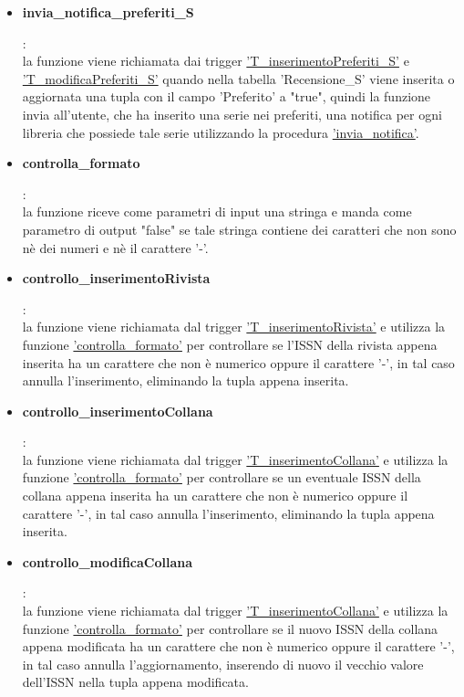 \documentclass{article}
\begin{document}
\begin{itemize}
    \item \hypertarget{f23}{\textbf{invia\_notifica\_preferiti\_S}}:\\
    la funzione viene richiamata dai trigger \hyperlink{t24}{'T\_inserimentoPreferiti\_S'} e \hyperlink{t25}{'T\_modificaPreferiti\_S'} quando nella tabella 'Recensione\_S' viene inserita o aggiornata una tupla con il campo 'Preferito' a "true", quindi la funzione invia all'utente, che ha inserito una serie nei preferiti, una notifica per ogni libreria che possiede tale serie utilizzando la procedura \hyperlink{p1}{'invia\_notifica'}.

    \item \hypertarget{f24}{\textbf{controlla\_formato}}:\\
    la funzione riceve come parametri di input una stringa e manda come parametro di output "false" se tale stringa contiene dei caratteri che non sono nè dei numeri e nè il carattere '-'.

    \item \hypertarget{f25}{\textbf{controllo\_inserimentoRivista}}:\\
    la funzione viene richiamata dal trigger \hyperlink{t26}{'T\_inserimentoRivista'} e utilizza la funzione \hyperlink{f24}{'controlla\_formato'} per controllare se l'ISSN della rivista appena inserita ha un carattere che non è numerico oppure il carattere '-', in tal caso annulla l'inserimento, eliminando la tupla appena inserita.

    \item \hypertarget{f26}{\textbf{controllo\_inserimentoCollana}}:\\
    la funzione viene richiamata dal trigger \hyperlink{t27}{'T\_inserimentoCollana'} e utilizza la funzione \hyperlink{f24}{'controlla\_formato'} per controllare se un eventuale ISSN della collana appena inserita ha un carattere che non è numerico oppure il carattere '-', in tal caso annulla l'inserimento, eliminando la tupla appena inserita.

    \item \hypertarget{f27}{\textbf{controllo\_modificaCollana}}:\\
    la funzione viene richiamata dal trigger \hyperlink{t28}{'T\_inserimentoCollana'} e utilizza la funzione \hyperlink{f24}{'controlla\_formato'} per controllare se il nuovo ISSN della collana appena modificata ha un carattere che non è numerico oppure il carattere '-', in tal caso annulla l'aggiornamento, inserendo di nuovo il vecchio valore dell'ISSN nella tupla appena modificata. 


\end{itemize}
\end{document}

